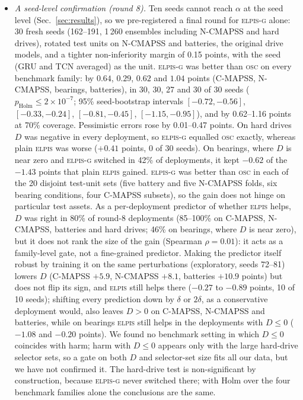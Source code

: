 \documentclass{esannV2}
\newcommand{\OSC}{\textsc{osc}}
\newcommand{\RPT}{\textsc{elpis}}
\newcommand{\AUTOD}{\textsc{elpis-g}}
\begin{document}
\begin{itemize}
\item \emph{A seed-level confirmation (round 8).} Ten seeds cannot reach $\alpha$ at the seed level (Sec.~\ref{sec:results}), so we pre-registered a final round for \AUTOD{} alone: 30 fresh seeds (162--191, 1\,260 ensembles including N-CMAPSS and hard drives), rotated test units on N-CMAPSS and batteries, the original drive models, and a tighter non-inferiority margin of 0.15 points, with the seed (GRU and TCN averaged) as the unit. \AUTOD{} was better than \OSC{} on every benchmark family: by $0.64$, $0.29$, $0.62$ and $1.04$ points (C-MAPSS, N-CMAPSS, bearings, batteries), in 30, 30, 27 and 30 of 30 seeds ($p_{\text{Holm}}\le2\times10^{-7}$; 95\% seed-bootstrap intervals $[-0.72,-0.56]$, $[-0.33,-0.24]$, $[-0.81,-0.45]$, $[-1.15,-0.95]$), and by 0.62--1.16 points at 70\% coverage. Pessimistic errors rose by 0.01--0.47 points. On hard drives $D$ was negative in every deployment, so \AUTOD{} equalled \OSC{} exactly, whereas plain \RPT{} was worse ($+0.41$ points, 0 of 30 seeds). On bearings, where $D$ is near zero and \AUTOD{} switched in 42\% of deployments, it kept $-0.62$ of the $-1.43$ points that plain \RPT{} gained. \AUTOD{} was better than \OSC{} in each of the 20 disjoint test-unit sets (five battery and five N-CMAPSS folds, six bearing conditions, four C-MAPSS subsets), so the gain does not hinge on particular test assets. As a per-deployment predictor of whether \RPT{} helps, $D$ was right in 80\% of round-8 deployments (85--100\% on C-MAPSS, N-CMAPSS, batteries and hard drives; 46\% on bearings, where $D$ is near zero), but it does not rank the size of the gain (Spearman $\rho=0.01$): it acts as a family-level gate, not a fine-grained predictor. Making the predictor itself robust by training it on the same perturbations (exploratory, seeds 72--81) lowers $D$ (C-MAPSS $+5.9$, N-CMAPSS $+8.1$, batteries $+10.9$ points) but does not flip its sign, and \RPT{} still helps there ($-0.27$ to $-0.89$ points, 10 of 10 seeds); shifting every prediction down by $\delta$ or $2\delta$, as a conservative deployment would, also leaves $D>0$ on C-MAPSS, N-CMAPSS and batteries, while on bearings \RPT{} still helps in the deployments with $D\le0$ ($-1.08$ and $-0.20$ points). We found no benchmark setting in which $D\le0$ coincides with harm; harm with $D\le0$ appears only with the large hard-drive selector sets, so a gate on both $D$ and selector-set size fits all our data, but we have not confirmed it. The hard-drive test is non-significant by construction, because \AUTOD{} never switched there; with Holm over the four benchmark families alone the conclusions are the same.
\end{itemize}
\end{document}

